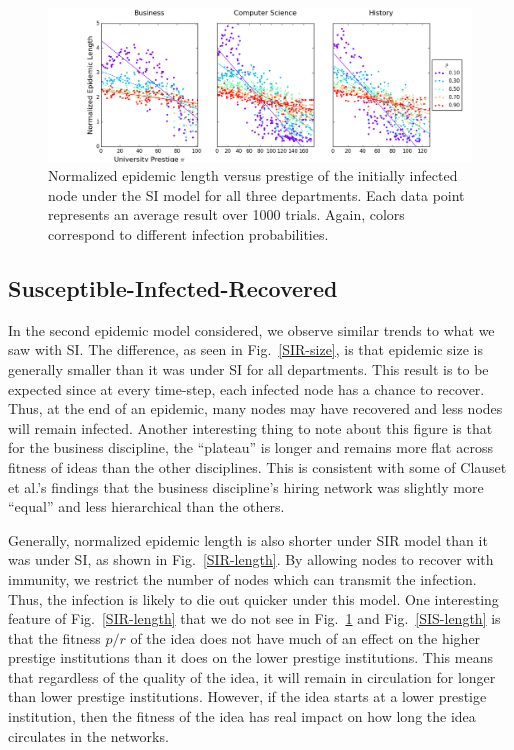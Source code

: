 \documentclass[%
 reprint,
 amsmath,amssymb,
 aps,
]{revtex4-1}
\begin{document}
\begin{figure}
	\centering
  \includegraphics[width=\textwidth]{figures/length-results-of-ALL-SI.png}
  \caption{Normalized epidemic length versus prestige of the initially infected node under the SI model for all three departments. Each data point represents an average result over 1000 trials. Again, colors correspond to different infection probabilities.}
   \label{SI-length}
\end{figure}

\subsection{\label{sec:level2}Susceptible-Infected-Recovered}

In the second epidemic model considered, we observe similar trends to what we saw with SI. The difference, as seen in Fig.~\ref{SIR-size}, is that epidemic size is generally smaller than it was under SI for all departments. This result is to be expected since at every time-step, each infected node has a chance to recover. Thus, at the end of an epidemic, many nodes may have recovered and less nodes will remain infected. Another interesting thing to note about this figure is that for the business discipline, the ``plateau'' is longer and remains more flat across fitness of ideas than the other disciplines. This is consistent with some of Clauset et al.'s findings that the business discipline's hiring network was slightly more ``equal'' and less hierarchical than the others.

Generally, normalized epidemic length is also shorter under SIR model than it was under SI, as shown in Fig.~\ref{SIR-length}. By allowing nodes to recover with immunity, we restrict the number of nodes which can transmit the infection. Thus, the infection is likely to die out quicker under this model. One interesting feature of Fig.~\ref{SIR-length} that we do not see in Fig.~\ref{SI-length} and Fig.~\ref{SIS-length} is that the fitness $p/r$ of the idea does not have much of an effect on the higher prestige institutions than it does on the lower prestige institutions. This means that regardless of the quality of the idea, it will remain in circulation for longer than lower prestige institutions. However, if the idea starts at a lower prestige institution, then the fitness of the idea has real impact on how long the idea circulates in the networks. 
\end{document}

